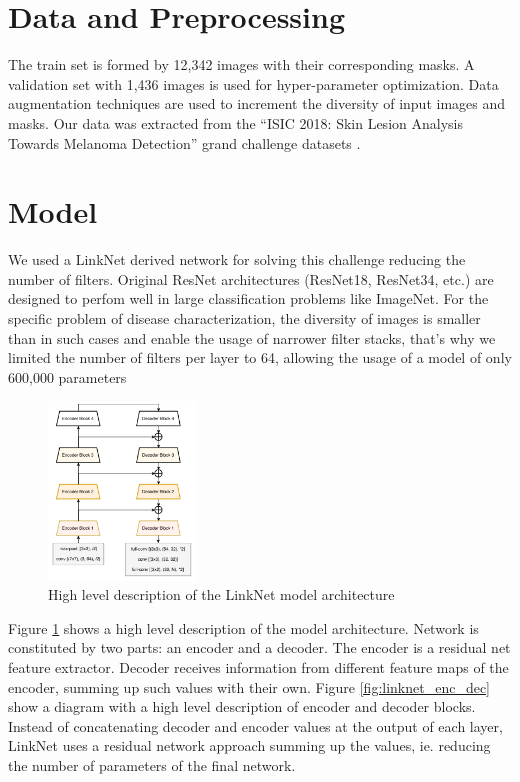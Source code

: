 \documentclass[preprint]{elsarticle}
\theoremstyle{definition} %
\theoremstyle{remark}
\begin{document}
\section{Data and Preprocessing}

The train set is formed by 12,342 images with their corresponding masks. A validation set with 1,436 images is used for hyper-parameter optimization. Data augmentation techniques are used to increment the diversity of input images and masks. Our data was extracted from the “ISIC 2018: Skin Lesion Analysis Towards Melanoma Detection” grand challenge datasets \cite{DBLP:journals/corr/abs-1710-05006} \cite{DBLP:journals/corr/abs-1803-10417}. 

\section{Model}\label{sec:class}

We used a LinkNet derived network for solving this challenge reducing the number of filters. Original ResNet architectures (ResNet18, ResNet34, etc.) are designed to perfom well in large classification problems like ImageNet\cite{imagenet_cvpr09}. For the specific problem of disease characterization, the diversity of images is smaller than in such cases and enable the usage of narrower filter stacks, that's why we limited the number of filters per layer to 64, allowing the usage of a model of only 600,000 parameters

\begin{figure}[h!]	
	\centering
	\includegraphics[width=0.35\textwidth]{./figures/linknet.png}
	\caption{High level description of the LinkNet model architecture \cite{DBLP:journals/corr/ChaurasiaC17}}
	\label{fig:linknet}
\end{figure}

Figure \ref{fig:linknet} shows a high level description of the model architecture. Network is constituted by two parts: an encoder and a decoder. The encoder is a residual net feature extractor. Decoder receives information from different feature maps of the encoder, summing up such values with their own. Figure \ref{fig:linknet_enc_dec} show a diagram with a high level description of encoder and decoder blocks. Instead of concatenating decoder and encoder values at the output of each layer, LinkNet uses a residual network approach summing up the values, ie. reducing the number of parameters of the final network.
\end{document}
